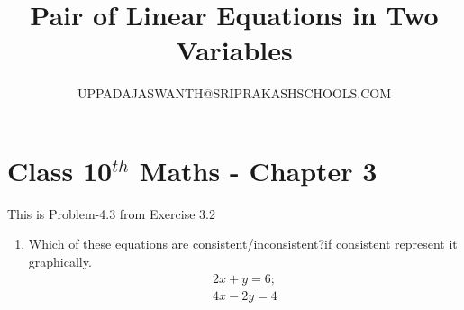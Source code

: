 \documentclass[12pt]{article}
\title{Pair of Linear Equations in Two Variables }
\author{UPPADAJASWANTH@SRIPRAKASHSCHOOLS.COM}
\begin{document}
\maketitle
\section*{Class 10$^{th}$ Maths - Chapter 3}
This is Problem-4.3 from Exercise 3.2
\begin{enumerate}
\item Which of these equations are consistent/inconsistent?if consistent represent it graphically.
\begin{align}
2x + y =6;\\
4x - 2y=4
\end{align} 


\end{enumerate}
\end{document}
